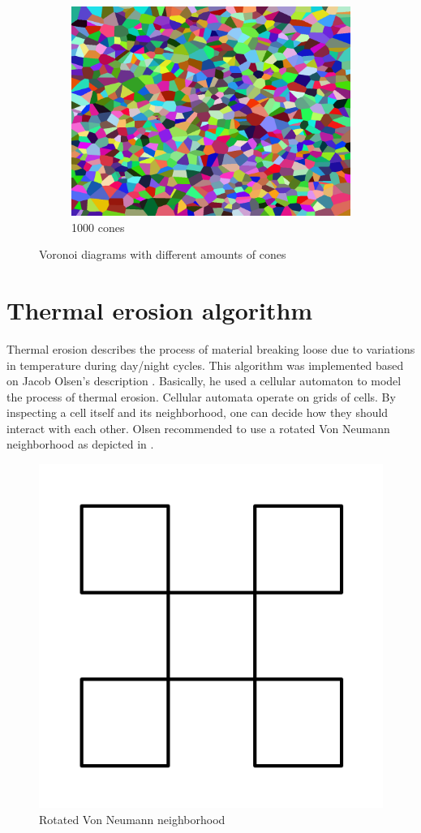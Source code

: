 \documentclass[11pt,a4paper,twoside,openright]{report}
\begin{document}
\begin{figure}[h]
\begin{subfigure}[b]{0.32\textwidth}
    \includegraphics[width=\textwidth]{voronoi1000.png}
    \caption{1000 cones}
    \label{fig:voronoi3}
  \end{subfigure}
  \caption{Voronoi diagrams with different amounts of cones}
\end{figure}

\section{Thermal erosion algorithm}
\label{sec:thermalerosion}
Thermal erosion describes the process of material breaking loose due to variations in temperature during day/night cycles. This algorithm was implemented based on Jacob Olsen's description \cite{Olsen:2004}. Basically, he used a cellular automaton to model the process of thermal erosion. Cellular automata operate on grids of cells. By inspecting a cell itself and its neighborhood, one can decide how they should interact with each other. Olsen recommended to use a rotated Von Neumann neighborhood as depicted in .

\begin{figure}[H]
\centering
\includegraphics[width=0.2\linewidth]{rotvonneumann.png}
\caption{Rotated Von Neumann neighborhood}\label{fig:rotvonneumann}
\end{figure}
\end{document}
